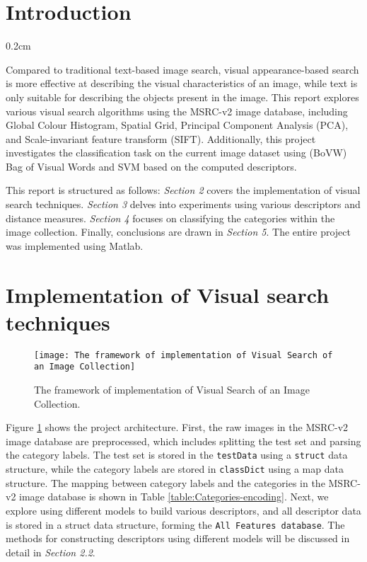 \documentclass{article}
\newcommand{\setParDis}{\setlength {\parskip} {0.2cm} } %
\begin{document}

\section{Introduction}
\setParDis

Compared to traditional text-based image search, visual appearance-based search is more effective at describing the visual characteristics of an image, while text is only suitable for describing the objects present in the image. This report explores various visual search algorithms using the MSRC-v2 image database, including Global Colour Histogram, Spatial Grid, Principal Component Analysis (PCA), and Scale-invariant feature transform (SIFT). Additionally, this project investigates the classification task on the current image dataset using (BoVW) Bag of Visual Words and SVM based on the computed descriptors.

This report is structured as follows: \textit{Section 2} covers the implementation of visual search techniques. \textit{Section 3} delves into experiments using various descriptors and distance measures. \textit{Section 4} focuses on classifying the categories within the image collection. Finally, conclusions are drawn in \textit{Section 5}. The entire project was implemented using Matlab.



\section{Implementation of Visual search techniques}

\begin{figure}[ht]
  \begin{center}
  \texttt{[image: The framework of implementation of Visual Search of an Image Collection]}
  \end{center}
  \caption{\label{fig:framework} The framework of implementation of Visual Search of an Image Collection.}
  \end{figure}

Figure \ref{fig:framework} shows the project architecture.  First, the raw images in the MSRC-v2 image database are preprocessed, which includes splitting the test set and parsing the category labels. The test set is stored in the \verb+testData+ using a \verb+struct+ data structure, while the category labels are stored in \verb+classDict+ using a map data structure. The mapping between category labels and the categories in the MSRC-v2 image database is shown in Table \ref{table:Categories-encoding}. Next, we explore using different models to build various descriptors, and all descriptor data is stored in a struct data structure, forming the \verb+All Features database+. The methods for constructing descriptors using different models will be discussed in detail in \textit{Section 2.2}.
\end{document}
